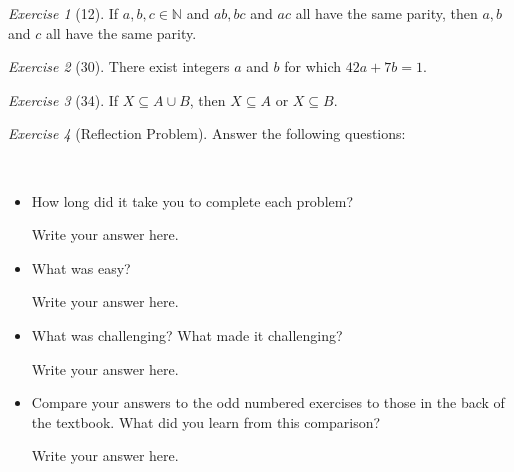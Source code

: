 \documentclass[12pt]{amsart}
\makeatletter
\theoremstyle{remark}
\newtheorem*{exercise}{Exercise}%
\def\NN{\ensuremath{\mathbb N}}
\renewenvironment{proof}[1][\proofname]{\par\doublespacing
  \pushQED{\qed}%
  \normalfont \topsep6\p@\@plus6\p@\relax
  \list{}{%
    \settowidth{\leftmargin}{\itshape\proofname:\hskip\labelsep}%
    \setlength{\labelwidth}{0pt}%
    \setlength{\itemindent}{-\leftmargin}%
  }%
  \item[\hskip\labelsep\itshape#1\@addpunct{:}]\ignorespaces
}{%
  \popQED\endlist\@endpefalse
  \singlespacing
}
\theoremstyle{mycomment}
\makeatother
\begin{document}
\begin{exercise}[12] If $a,b,c\in\NN$ and $ab, bc$ and $ac$ all have the same parity, then $a,b$ and $c$ all have the same parity.
\begin{proof}%
\end{proof}
\end{exercise}

\begin{exercise}[30] There exist integers $a$ and $b$ for which $42a+7b=1$.
\begin{proof}%
\end{proof}
\end{exercise}

\begin{exercise}[34] If $X\subseteq A\cup B$, then $X\subseteq A$ or $X\subseteq B$.
\begin{proof}%
\end{proof}
\end{exercise}



\begin{exercise}[Reflection Problem]
Answer the following questions:


\begin{proof} \ 


\begin{itemize}
\item How long did it take you to complete each problem? 

Write your answer here.
\item What was easy?

Write your answer here.
\item What was challenging? What made it challenging?

Write your answer here.
\item Compare your answers to the odd numbered exercises to those in the back of the textbook. What did you learn from this comparison?

Write your answer here.
\end{itemize}\end{proof}
\end{exercise}









 
\end{document}
